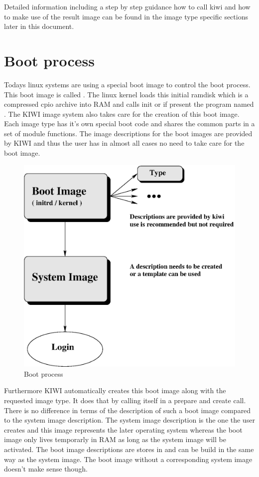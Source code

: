 Detailed information including a step by step guidance how to call
kiwi and how to make use of the result image can be found in the image
type specific sections later in this document.

\section{Boot process}
Todays linux systems are using a special boot image to control the
boot process. This boot image is called . The linux
kernel loads this initial ramdisk which is a compressed cpio archive
into RAM and calls init or if present the program named . The
KIWI image system also takes care for the creation of this boot image.
Each image type has it's own special boot code and shares the common
parts in a set of module functions. The image descriptions for the
boot images are provided by KIWI and thus the user has in almost all
cases no need to take care for the boot image.

\begin{figure}[h]
\centering
\includegraphics[scale=0.5]{pictures/activation.eps}
\caption{Boot process}
\label{fig:initrd}
\end{figure}

Furthermore KIWI automatically creates this boot image along with
the requested image type. It does that by calling itself in a prepare
and create call. There is no difference in terms of the description
of such a boot image compared to the system image description. The
system image description is the one the user creates and this image
represents the later operating system whereas the boot image only
lives temporarly in RAM as long as the system image will be activated.
The boot image descriptions are stores in 
and can be build in the same way as the system image. The boot image
without a corresponding system image doesn't make sense though.

